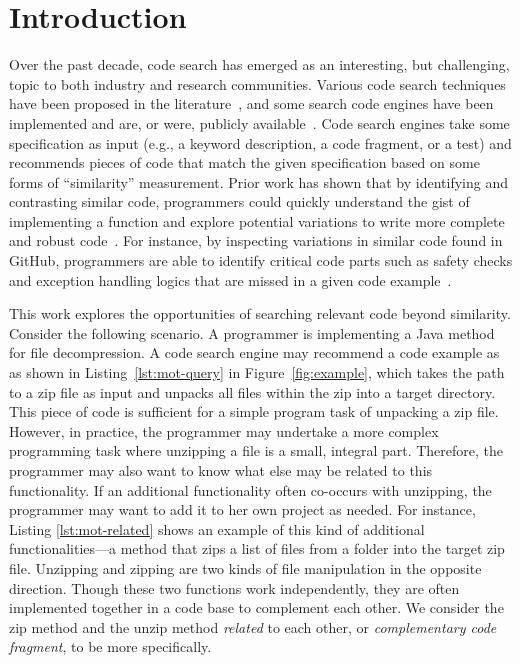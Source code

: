 \section{Introduction}
\label{sec:intro}
Over the past decade, code search has emerged as an interesting, but
challenging, topic to both industry and research communities. Various code search
techniques have been proposed in the
literature~\cite{bajracharya2009sourcerer,reiss2009semantics,lazzarini2009applying,mcmillan2012exemplar}, and
some search code engines have been implemented and are, or were, publicly
available~\cite{googlesearch, github,codase,krugle,ohloh,searchcode}. Code search engines 
take some specification as input (e.g., a keyword description, a code fragment, or a test) and 
recommends pieces of code that match the given specification based on some forms of ``similarity'' measurement. Prior work has shown that by identifying and contrasting similar code, programmers could quickly understand the gist of implementing a function and explore potential variations to write more complete and robust code~\cite{zhang2019analyzing, luan2019aroma}. For instance, by inspecting variations in similar code found in GitHub, programmers are able to identify critical code parts such as safety checks and exception handling logics that are missed in a given code example~\cite{zhang2019analyzing}.


This work explores the opportunities of searching relevant code beyond similarity. Consider
the following scenario. A programmer is implementing a Java method for
file decompression. A code search engine may recommend a code example as as shown in 
Listing~\ref{lst:mot-query} in Figure~\ref{fig:example}, which takes the path to a zip file as input and
unpacks all files within the zip into a target directory.  This piece of code is sufficient for 
a simple program task of unpacking a zip file. However, in practice, the programmer 
may undertake a more complex programming task where unzipping a file is a small,
integral part. Therefore, the programmer may also want to know what else may be
related to this functionality. 
 If an additional functionality often co-occurs with unzipping, the programmer may want to add it
to her own project as needed. 
For instance, Listing \ref{lst:mot-related} shows an example of this kind of additional 
functionalities---a method that zips a list of files from a folder into the target zip file. Unzipping
and zipping are two kinds of file manipulation in the opposite direction. 
Though these two functions work independently, they are often implemented together in a code base to complement each other. We consider the zip method and the unzip method {\em related} to each other, or {\em complementary code fragment}, to be more specifically.

